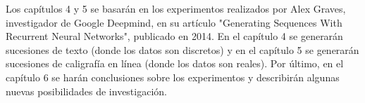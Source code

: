 \vspace{1em}

Los capítulos 4 y 5 se basarán en los experimentos realizados por Alex Graves, investigador de Google Deepmind, en su artículo "Generating Sequences With Recurrent Neural Networks", publicado en 2014. En el capítulo 4 se generarán sucesiones de texto (donde los datos son discretos)  y en el capítulo 5 se generarán sucesiones de caligrafía en línea (donde los datos son reales). Por último, en el capítulo 6 se harán conclusiones sobre los experimentos y describirán algunas nuevas posibilidades de investigación. \cite{DBLP:journals/corr/Graves13}



